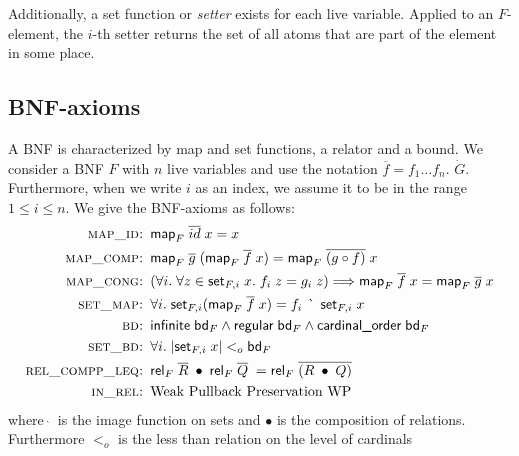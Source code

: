     Additionally, a set function or \textit{setter} exists for each live variable. Applied to an $F$-element, the $i$-th setter returns the set of all atoms that are part of the element in some place.


    \subsection{BNF-axioms}
      A \ac{BNF} is characterized by map and set functions, a relator and a bound. We consider a \ac{BNF} $F$ with $n$ live variables and use the notation $\overline{f} = f_1 \dots f_n$. $\dot{G}$. Furthermore, when we write $i$ as an index, we assume it to be in the range $1 \leq i \leq n$.
      We give the \ac{BNF}-axioms as follows:
      \begin{align}
        \textsc{map\_id: }& \textsf{map}_F\; \overline{id}\; x = x\\
        \textsc{map\_comp: }& \textsf{map}_F\; \overline{g}\; (\textsf{map}_F\; \overline{f}\; x) = \textsf{map}_F\; \overline{(g \circ f)}\; x\\
        \textsc{map\_cong: }& (\forall i.\; \forall z \in \textsf{set}_{F,i}\; x.\; f_i\; z = g_i\; z) \Longrightarrow 
          \textsf{map}_F\; \overline{f}\; x = \textsf{map}_F\; \overline{g}\; x\\
        \textsc{set\_map: }& \forall i.\; \textsf{set}_{F,i} (\textsf{map}_F\; \overline{f}\; x) = f_i\; \grave{\phantom{\_}}\; \textsf{set}_{F,i}\; x\\
        \textsc{bd: }& \textsf{infinite}\; \textsf{bd}_F \land 
          \textsf{regular}\; \textsf{bd}_F \land 
          \textsf{cardinal\_order}\; \textsf{bd}_F\\
        \textsc{set\_bd: }& \forall i.\; | \textsf{set}_{F,i}\; x | <_o \textsf{bd}_F\\
        \textsc{rel\_compp\_leq: }& \textsf{rel}_F\; \overline{R}\; \bullet\; \textsf{rel}_F\; \overline{Q}\; = 
          \textsf{rel}_F\; \overline{(R\; \bullet\; Q)}\\
        \textsc{in\_rel: }& \text{Weak Pullback Preservation WP}
      \end{align}
      \noindent where $\grave{\phantom{\_}}$ is the image function on sets and $\bullet$ is the composition of relations. Furthermore $<_o$ is the less than relation on the level of cardinals

